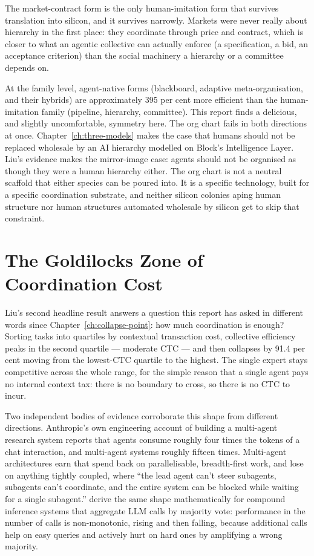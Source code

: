 The market-contract form is the only human-imitation form that survives translation into silicon, and it survives narrowly. Markets were never really about hierarchy in the first place: they coordinate through price and contract, which is closer to what an agentic collective can actually enforce (a specification, a bid, an acceptance criterion) than the social machinery a hierarchy or a committee depends on.

At the family level, agent-native forms (blackboard, adaptive meta-organisation, and their hybrids) are approximately 395 per cent more efficient than the human-imitation family (pipeline, hierarchy, committee). This report finds a delicious, and slightly uncomfortable, symmetry here. The org chart fails in both directions at once. Chapter~\ref{ch:three-models} makes the case that humans should not be replaced wholesale by an AI hierarchy modelled on Block's Intelligence Layer. Liu's evidence makes the mirror-image case: agents should not be organised as though they were a human hierarchy either. The org chart is not a neutral scaffold that either species can be poured into. It is a specific technology, built for a specific coordination substrate, and neither silicon colonies aping human structure nor human structures automated wholesale by silicon get to skip that constraint.

\section{The Goldilocks Zone of Coordination Cost}

Liu's second headline result answers a question this report has asked in different words since Chapter~\ref{ch:collapse-point}: how much coordination is enough? Sorting tasks into quartiles by contextual transaction cost, collective efficiency peaks in the second quartile --- moderate CTC --- and then collapses by 91.4 per cent moving from the lowest-CTC quartile to the highest. The single expert stays competitive across the whole range, for the simple reason that a single agent pays no internal context tax: there is no boundary to cross, so there is no CTC to incur.

Two independent bodies of evidence corroborate this shape from different directions. Anthropic's own engineering account of building a multi-agent research system \parencite{Anthropic2025MultiAgent} reports that agents consume roughly four times the tokens of a chat interaction, and multi-agent systems roughly fifteen times. Multi-agent architectures earn that spend back on parallelisable, breadth-first work, and lose on anything tightly coupled, where ``the lead agent can't steer subagents, subagents can't coordinate, and the entire system can be blocked while waiting for a single subagent.'' \textcite{Chen2024MoreCalls} derive the same shape mathematically for compound inference systems that aggregate LLM calls by majority vote: performance in the number of calls is non-monotonic, rising and then falling, because additional calls help on easy queries and actively hurt on hard ones by amplifying a wrong majority.

